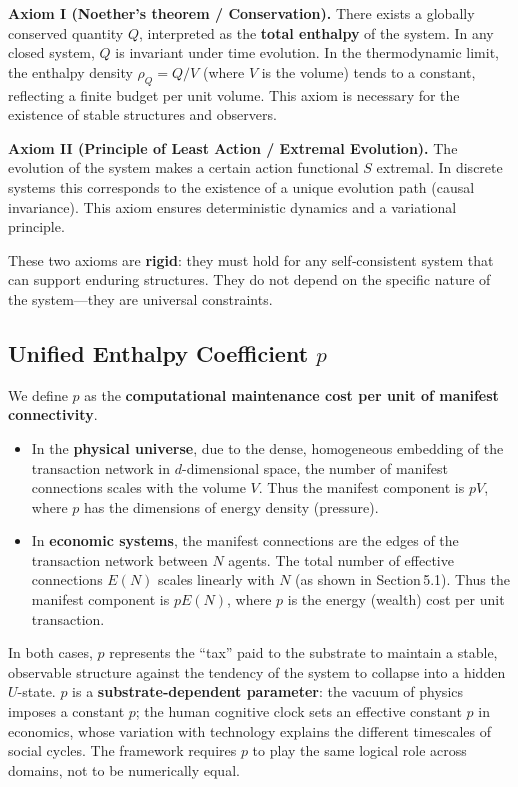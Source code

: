 \documentclass{article}
\begin{document}
\textbf{Axiom I (Noether’s theorem / Conservation).}  
There exists a globally conserved quantity $Q$, interpreted as the \textbf{total enthalpy} of the system. In any closed system, $Q$ is invariant under time evolution. In the thermodynamic limit, the enthalpy density $\rho_Q = Q/V$ (where $V$ is the volume) tends to a constant, reflecting a finite budget per unit volume. This axiom is necessary for the existence of stable structures and observers.

\textbf{Axiom II (Principle of Least Action / Extremal Evolution).}  
The evolution of the system makes a certain action functional $S$ extremal. In discrete systems this corresponds to the existence of a unique evolution path (causal invariance). This axiom ensures deterministic dynamics and a variational principle.

These two axioms are \textbf{rigid}: they must hold for any self‑consistent system that can support enduring structures. They do not depend on the specific nature of the system—they are universal constraints.

\subsection{Unified Enthalpy Coefficient $p$}
We define $p$ as the \textbf{computational maintenance cost per unit of manifest connectivity}.  
\begin{itemize}
    \item In the \textbf{physical universe}, due to the dense, homogeneous embedding of the transaction network in $d$-dimensional space, the number of manifest connections scales with the volume $V$. Thus the manifest component is $pV$, where $p$ has the dimensions of energy density (pressure).  
    \item In \textbf{economic systems}, the manifest connections are the edges of the transaction network between $N$ agents. The total number of effective connections $E(N)$ scales linearly with $N$ (as shown in Section 5.1). Thus the manifest component is $pE(N)$, where $p$ is the energy (wealth) cost per unit transaction.
\end{itemize}
In both cases, $p$ represents the “tax” paid to the substrate to maintain a stable, observable structure against the tendency of the system to collapse into a hidden $U$-state. $p$ is a \textbf{substrate‑dependent parameter}: the vacuum of physics imposes a constant $p$; the human cognitive clock sets an effective constant $p$ in economics, whose variation with technology explains the different timescales of social cycles. The framework requires $p$ to play the same logical role across domains, not to be numerically equal.
\end{document}
